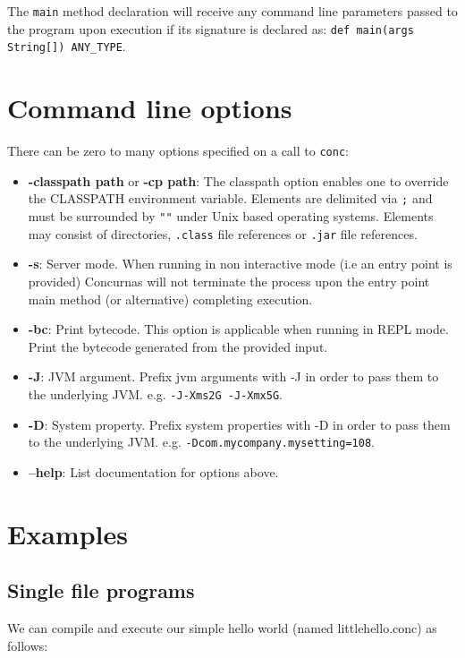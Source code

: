 \documentclass[conc-doc]{subfiles}
\begin{document}
The \lstinline{main} method declaration will receive any command line parameters passed to the program upon execution if its signature is declared as: \lstinline{def main(args String[]) ANY_TYPE}.

\section{Command line options}
\label{sec:cmdlineparams}
There can be zero to many options specified on a call to \lstinline[language=None]{conc}:
\begin{itemize}
	\item \textbf{-classpath path} or \textbf{-cp path}: The classpath option enables one to override the CLASSPATH environment variable. Elements are delimited via \lstinline[language=None]{;} and must be surrounded by \lstinline[language=None]{""} under Unix based operating systems. Elements may consist of directories, \lstinline{.class} file references or \lstinline{.jar} file references.
	\item \textbf{-s}: Server mode. When running in non interactive mode (i.e an entry point is provided) Concurnas will not terminate the process upon the entry point main method (or alternative) completing execution.
	\item \textbf{-bc}: Print bytecode. This option is applicable when running in REPL mode. Print the bytecode generated from the provided input.
	\item \textbf{-J}: JVM argument. Prefix jvm arguments with -J in order to pass them to the underlying JVM. e.g. \lstinline{-J-Xms2G -J-Xmx5G}.
	\item \textbf{-D}: System property. Prefix system properties with -D in order to pass them to the underlying JVM. e.g. \lstinline{-Dcom.mycompany.mysetting=108}.
	\item \textbf{--help}: List documentation for options above.
\end{itemize}



\section{Examples}
\subsection{Single file programs}
We can compile and execute our simple hello world (named littlehello.conc) as follows:
\end{document}
